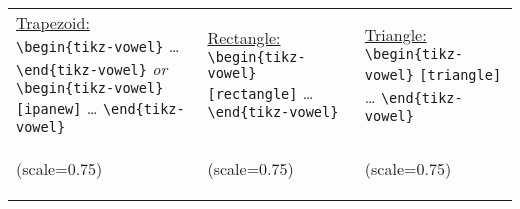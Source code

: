 \documentclass{article}
\begin{document}
\begin{center}
\begin{tabular}{p{4.5cm} p{4.5cm} p{4.5cm}}
  {\small
	\underline{Trapezoid:}\newline\newline
    \verb|\begin{tikz-vowel}|\newline
    	\hspace*{3em}\dots\newline
    \verb|\end{tikz-vowel}|\newline
    \emph{or}\newline
    \verb|\begin{tikz-vowel}[ipanew]|\newline
    	\hspace*{3em}\dots\newline
    \verb|\end{tikz-vowel}|\newline
    }
  &
  {\small
  	\underline{Rectangle:}\newline\newline
    \verb|\begin{tikz-vowel}|\newline
    	\hspace*{\fill}\verb|[rectangle]|\newline
    	\hspace*{3em}\dots\newline
    \verb|\end{tikz-vowel}|\newline
    }
  &
  {\small
  	\underline{Triangle:} \newline\newline
    \verb|\begin{tikz-vowel}|\newline
    	\hspace*{\fill}\verb|[triangle]|\newline
    	\hspace*{3em}\dots\newline
    \verb|\end{tikz-vowel}|\newline
    }\\

	\begin{tikz-vowel}(scale=0.75)\end{tikz-vowel} & 
	\begin{tikz-vowel}[rectangle](scale=0.75)\end{tikz-vowel} & 
	\begin{tikz-vowel}[triangle](scale=0.75)\end{tikz-vowel}

\end{tabular}
\end{center}
\end{document}
